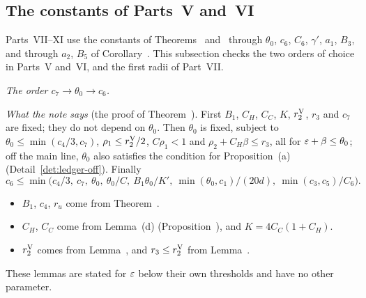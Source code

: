 \subsection{The constants of Parts~V and~VI}\label{subsec:ledger-VVI}

Parts~VII--XI use the constants of Theorems~ and~ through $\theta_0$, $c_6$, $C_6$, $\gamma'$, $a_1$, $B_3$, and through $a_2$, $B_5$ of Corollary~. This subsection checks the two orders of choice in Parts~V and~VI, and the first radii of Part~VII.

\begin{detail}\label{det:ledger-c6c7}
\emph{The order $c_7\to\theta_0\to c_6$.}

\emph{What the note says} (the proof of Theorem~). First $B_1$, $C_H$, $C_C$, $K$, $r_2^{\rm V}$, $r_3$ and $c_7$ are fixed; they do not depend on $\theta_0$. Then $\theta_0$ is fixed, subject to $\theta_0\le\min(c_4/3,c_7)$, $\rho_1\le r_2^{\rm V}/2$, $C\rho_1<1$ and $\rho_2+C_H\beta\le r_3$, all for $\varepsilon+\beta\le\theta_0$; off the main line, $\theta_0$ also satisfies the condition for Proposition~(a) (Detail~\ref{det:ledger-off}). Finally
\[
c_6\le\min\big(c_4/3,\ c_7,\ \theta_0,\ \theta_0/C,\ B_1\theta_0/K',\ \min(\theta_0,c_1)/(20d),\ \min(c_3,c_5)/C_6\big).
\]

\begin{step}
\begin{itemize}
\item $B_1$, $c_4$, $r_u$ come from Theorem~.
\item $C_H$, $C_C$ come from Lemma~(d) (Proposition~), and $K=4C_C(1+C_H)$.
\item $r_2^{\rm V}$ comes from Lemma~, and $r_3\le r_2^{\rm V}$ from Lemma~.
\end{itemize}
These lemmas are stated for $\varepsilon$ below their own thresholds and have no other parameter.


\end{step}
\end{detail}
